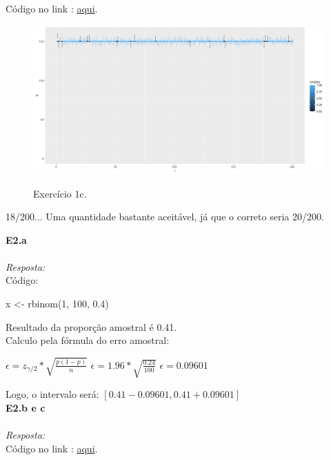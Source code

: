 \documentclass{article}
\begin{document}
	Código no link : \href{https://github.com/HiimHotta/MAE0119/blob/main/SimulaIC/1c.R}{aqui}.
	
	\begin{figure}[h]
		\caption{Exercício 1c.}
		\centering %
		\includegraphics[width=16cm]{ex1c.png} %
		\label{figura:ex3p1}
	\end{figure}

    18/200... Uma quantidade bastante aceitável, já que o correto seria 20/200.
    
    \textbf {E2.a} 
    \\ \\
    \textit {Resposta:} \\	
    
    Código:
    
    \begin{center}
   	    x <- rbinom(1, 100, 0.4)
    \end{center}
    
    Resultado da proporção amostral é 0.41.\\
    
    Calculo pela fórmula do erro amostral:
    
    \begin{center}
    	$\epsilon =  z_{\gamma / 2} * \sqrt{\frac{p (1- p)}{n}}$
    	$\epsilon = 1.96 * \sqrt{\frac{0.24}{100}}$
    	$\epsilon = 0.09601$
    \end{center}

     Logo, o intervalo será: $[0.41 - 0.09601, 0.41 + 0.09601]$\\
     
    \textbf {E2.b e c} 
    \\ \\
    \textit {Resposta:} \\	
    
    Código no link : \href{https://github.com/HiimHotta/MAE0119/blob/main/SimulaIC/2b.R}{aqui}.\\
    
\end{document}
